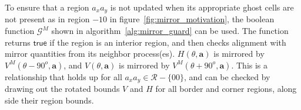 To ensure that
a region $a_xa_y$ is not updated when its appropriate ghost cells are not present
as in region $-10$ in figure~\ref{fig:mirror_motivation}, the boolean function
$\mathcal{G}^M$ shown in algorithm~\ref{alg:mirror_guard} can be used.  The function
returns $\textsf{true}$ if the region is an interior region, and then checks alignment
with mirror quantities from its neighbor process(es).  $H(\theta,\mathbf{a})$ is
mirrored by $V^M(\theta - 90^o,\mathbf{a})$, and $V(\theta,\mathbf{a})$ is mirrored
by $V^M(\theta + 90^o,\mathbf{a})$.  This is a relationship that holds up for all
$a_xa_y \in \mathcal{R} - \{00\}$, and can be checked by drawing out the rotated bounds
$V$ and $H$ for all border and corner regions, along side their region bounds.



